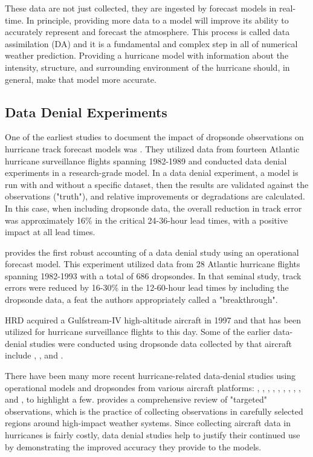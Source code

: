 \documentclass{article}
\begin{document}
These data are not just collected, they are ingested by forecast models in real-time. In principle, providing more data to a model will improve its ability to accurately represent and forecast the atmosphere. This process is called data assimilation (DA) and it is a fundamental and complex step in all of numerical weather prediction. Providing a hurricane model with information about the intensity, structure, and surrounding environment of the hurricane should, in general, make that model more accurate.

\subsection{Data Denial Experiments}

One of the earliest studies to document the impact of dropsonde observations on hurricane track forecast models was \cite{Franklin_DeMaria1992}. They utilized data from fourteen Atlantic hurricane surveillance flights spanning 1982-1989 and conducted data denial experiments in a research-grade model. In a data denial experiment, a model is run with and without a specific dataset, then the results are validated against the observations ("truth"), and relative improvements or degradations are calculated. In this case, when including dropsonde data, the overall reduction in track error was approximately 16\% in the critical 24-36-hour lead times, with a positive impact at all lead times.

\cite{BurpeeEA1996} provides the first robust accounting of a data denial study using an operational forecast model. This experiment utilized data from 28 Atlantic hurricane flights spanning 1982-1993 with a total of 686 dropsondes. In that seminal study, track errors were reduced by 16-30\% in the 12-60-hour lead times by including the dropsonde data, a feat the authors appropriately called a "breakthrough".

HRD acquired a Gulfstream-IV high-altitude aircraft in 1997 and that has been utilized for hurricane surveillance flights to this day. Some of the earlier data-denial studies were conducted using dropsonde data collected by that aircraft include \cite{Aberson_Franklin1999}, \cite{Aberson2002}, and \cite{Aberson2010}. 

There have been many more recent hurricane-related data-denial studies using operational models and dropsondes from various aircraft platforms: \cite{Aberson2011}, \cite{ChouEA2011}, \cite{MajumdarEA2013}, \cite{ChristophersonEA2017}, \cite{ChristophersonEA2018}, \cite{KrenEA2018}, \cite{TongEA2018}, \cite{AksoyEA2022}, \cite{SippelEA2022}, and \cite{DitchekEA2023}, to highlight a few. \cite{Majumdar2016} provides a comprehensive review of "targeted" observations, which is the practice of collecting observations in carefully selected regions around high-impact weather systems. Since collecting aircraft data in hurricanes is fairly costly, data denial studies help to justify their continued use by demonstrating the improved accuracy they provide to the models.
\end{document}
